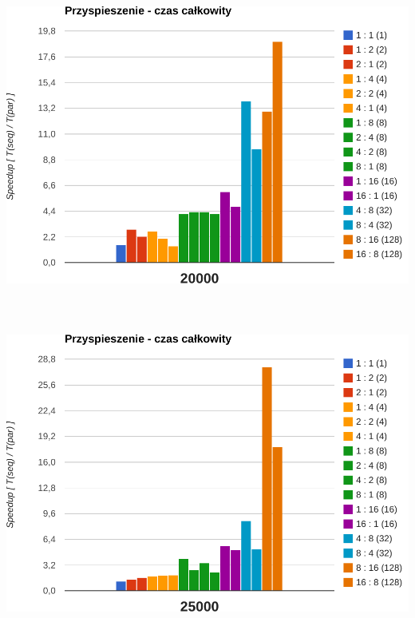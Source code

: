 \documentclass[paper=a4, fontsize=11pt]{scrartcl}	%
\numberwithin{equation}{section}		%
\numberwithin{figure}{section}			%
\numberwithin{table}{section}				%
\begin{document}
\begin{center}
\includegraphics[width=135mm]{report/speedup-20000.pdf} \\ \ \\ \ \\ \ \\

\includegraphics[width=135mm]{report/speedup-25000.pdf} \\ \ \\ \ \\ \ \\


\end{center}
\end{document}
